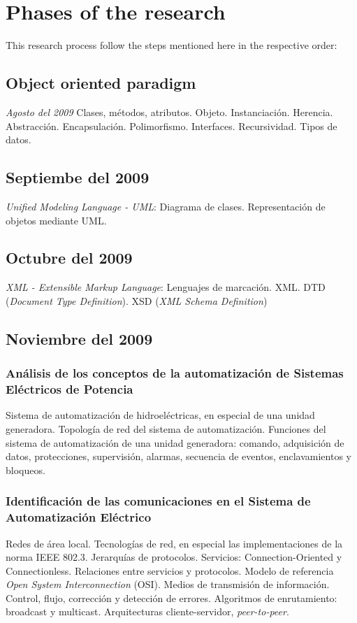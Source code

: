 \section{Phases of the research}

This research process follow the steps mentioned here 
in the respective order: 


	\subsection{Object oriented paradigm}
		\emph{Agosto del 2009}
			Clases, m\'etodos, atributos. 
			Objeto. 
			Instanciaci\'on.
			Herencia. 
			Abstracci\'on. 
			Encapsulaci\'on. 
			Polimorfismo. 
			Interfaces. 
			Recursividad. 
			Tipos de datos.
	\subsection{Septiembe del 2009}
		\emph{Unified Modeling Language - UML}:
			Diagrama de clases. 
			Representaci\'on de objetos mediante UML.
	\subsection{Octubre del 2009}
		\emph{XML - Extensible Markup Language}:
			Lenguajes de marcaci\'on.
			XML.
			DTD (\emph{Document Type Definition}).
			XSD (\emph{XML Schema Definition})
	\subsection{Noviembre del 2009}
		\subsubsection{An\'alisis de los 
		conceptos de la automatizaci\'on 
		de Sistemas El\'ectricos de Potencia}
			Sistema de automatizaci\'on 
			de hidroel\'ectricas, 
			en especial de una unidad generadora. 
			Topolog\'ia de red del 
			sistema de automatizaci\'on. 
			Funciones del sistema de automatizaci\'on 
			de una unidad generadora: comando, 
			adquisici\'on de datos, 
			protecciones, supervisi\'on, 
			alarmas, secuencia de eventos, 
			enclavamientos y bloqueos.
		\subsubsection{Identificaci\'on de las 
		comunicaciones en el Sistema de Automatizaci\'on El\'ectrico}
			Redes de \'area local.
			Tecnolog\'ias de red, en especial las 
			implementaciones de la norma IEEE 802.3. 
			Jerarqu\'ias de protocolos.
			Servicios: Connection-Oriented y Connectionless.
			Relaciones entre servicios y protocolos.
			Modelo de referencia \emph{Open System Interconnection} (OSI). 
			Medios de transmisi\'on de informaci\'on. 
			Control, flujo, correcci\'on y detecci\'on de errores. 
			Algoritmos de enrutamiento: broadcast y multicast.
			Arquitecturas cliente-servidor, \emph{peer-to-peer}.
